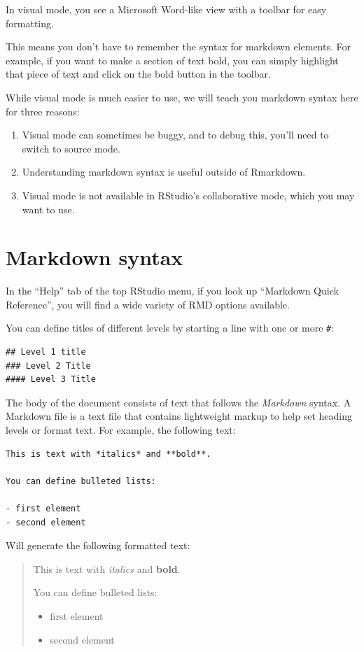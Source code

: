 \documentclass[
  letterpaper,
  DIV=11,
  numbers=noendperiod]{scrreprt}
\providecommand{\tightlist}{%
  \setlength{\itemsep}{0pt}\setlength{\parskip}{0pt}}\usepackage{longtable,booktabs,array}
\begin{document}
In visual mode, you see a Microsoft Word-like view with a toolbar for
easy formatting.

This means you don't have to remember the syntax for markdown elements.
For example, if you want to make a section of text bold, you can simply
highlight that piece of text and click on the bold button in the
toolbar.

While visual mode is much easier to use, we will teach you markdown
syntax here for three reasons:

\begin{enumerate}
\def\labelenumi{\arabic{enumi}.}
\item
  Visual mode can sometimes be buggy, and to debug this, you'll need to
  switch to source mode.
\item
  Understanding markdown syntax is useful outside of Rmarkdown.
\item
  Visual mode is not available in RStudio's collaborative mode, which
  you may want to use.
\end{enumerate}

\section{Markdown syntax}\label{markdown-syntax}

In the ``Help'' tab of the top RStudio menu, if you look up ``Markdown
Quick Reference'', you will find a wide variety of RMD options
available.

You can define titles of different levels by starting a line with one or
more \texttt{\#}:

\begin{verbatim}
## Level 1 title
### Level 2 Title
#### Level 3 Title
\end{verbatim}

The body of the document consists of text that follows the
\emph{Markdown} syntax. A Markdown file is a text file that contains
lightweight markup to help set heading levels or format text. For
example, the following text:

\begin{verbatim}
This is text with *italics* and **bold**.

You can define bulleted lists:

- first element
- second element
\end{verbatim}

Will generate the following formatted text:

\begin{quote}
This is text with \emph{italics} and \textbf{bold}.

You can define bulleted lists:

\begin{itemize}
\tightlist
\item
  first element
\item
  second element
\end{itemize}
\end{quote}
\end{document}
